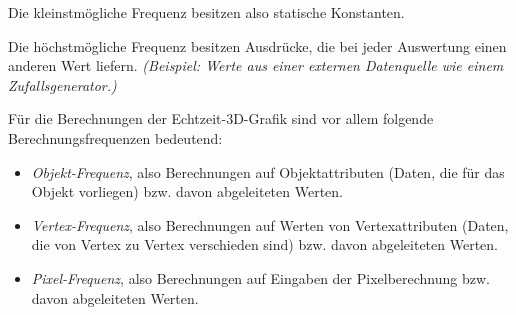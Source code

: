 \documentclass[twoside,a4paper,fleqn,12pt]{book}
\begin{document}
Die kleinstmögliche Frequenz besitzen also statische Konstanten.

Die höchstmögliche Frequenz besitzen Ausdrücke, die bei jeder Auswertung einen anderen Wert liefern.
\emph{(Beispiel: Werte aus einer externen Datenquelle wie einem Zufallsgenerator.)}

Für die Berechnungen der Echtzeit-3D-Grafik sind vor allem folgende Berechnungsfrequenzen bedeutend:
\begin{itemize}
\item \emph{Objekt-Frequenz}, also Berechnungen auf Objektattributen (Daten, die für das Objekt vorliegen)
bzw. davon abgeleiteten Werten.
\item \emph{Vertex-Frequenz}, also Berechnungen auf Werten von Vertexattributen (Daten, die von Vertex zu Vertex verschieden sind)
bzw. davon abgeleiteten Werten.
\item \emph{Pixel-Frequenz}, also Berechnungen auf Eingaben der Pixelberechnung bzw. davon abgeleiteten Werten.
\end{itemize}

\end{document}
